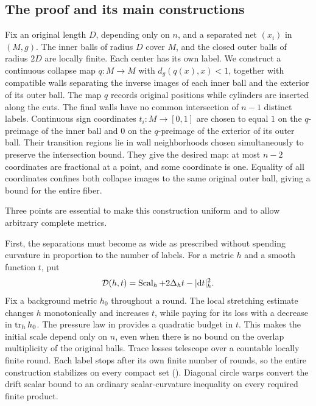 \subsection{The proof and its main constructions}

Fix an original length \(D\), depending only on \(n\), and a separated
net \((x_i)\) in \((M,g)\). The inner balls of radius \(D\) cover \(M\),
and the closed outer balls of radius \(2D\) are locally finite. Each
center has its own label. We construct a continuous collapse map
$q:M\to M$ with $d_g(q(x),x)<1$, together with compatible walls
separating the inverse images of each inner ball and the exterior of
its outer ball. The map $q$ records original positions while cylinders
are inserted along the cuts. The final
walls have no common intersection of \(n-1\) distinct labels. Continuous
sign coordinates $t_i:M\to[0,1]$ are chosen to equal $1$ on the
$q$-preimage of the inner ball and $0$ on the $q$-preimage of the exterior
of its outer ball. Their transition regions lie in wall neighborhoods
chosen simultaneously to preserve the intersection bound. They give the
desired map: at most \(n-2\) coordinates
are fractional at a point, and some coordinate is one. Equality of all
coordinates confines both collapse images to the same original outer
ball, giving a bound for the entire fiber.

Three points are essential to make this construction uniform and to
allow arbitrary complete metrics.

First, the separations must become as wide as prescribed without
spending curvature in proportion to the number of labels. For a metric
\(h\) and a smooth function \(t\), put
\begin{equation}\label{intro:drift-scalar}
 \mathcal D(h,t)=\operatorname{Scal}_h+2\Delta_h t-|\mathrm d t|_h^2.
\end{equation}
Fix a background metric \(h_0\) throughout a round. The local stretching
estimate changes \(h\) monotonically and increases \(t\), while paying
for its loss with a decrease in \(\operatorname{tr}_h h_0\).
The pressure law in  provides a quadratic budget in
\(t\). This makes the initial scale depend only on \(n\), even when
there is no bound on the overlap multiplicity of the original balls.
Trace losses telescope over a countable locally finite round. Each
label stops after its own finite number of rounds, so the entire
construction stabilizes on every compact set
(). Diagonal circle warps convert the drift scalar
bound to an ordinary scalar-curvature inequality on every required
finite product.

